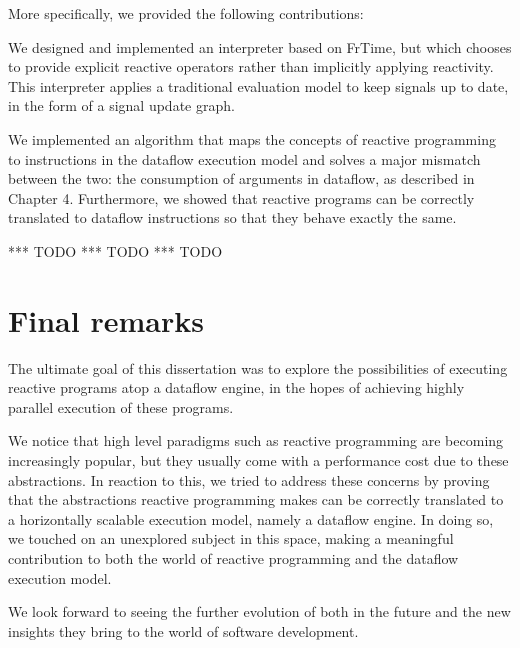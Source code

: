 More specifically, we provided the following contributions:

\begin{description}[style=nextline]
	\item[An interpreter for a reactive language] We designed and implemented an interpreter based on FrTime, but which chooses to provide explicit reactive operators rather than implicitly applying reactivity. This interpreter applies a traditional evaluation model to keep signals up to date, in the form of a signal update graph. 
	\item[A mapping algorithm from signals to dataflow instructions] We implemented an algorithm that maps the concepts of reactive programming to instructions in the dataflow execution model and solves a major mismatch between the two: the consumption of arguments in dataflow, as described in Chapter 4. Furthermore, we showed that reactive programs can be correctly translated to dataflow instructions so that they behave exactly the same. 
	\item[Comparison of a traditional reactive evaluation model and signals atop the dataflow execution model] *** TODO *** TODO *** TODO
\end{description}

\newpage
\section{Final remarks}

The ultimate goal of this dissertation was to explore the possibilities of executing reactive programs atop a dataflow engine, in the hopes of achieving highly parallel execution of these programs. 

We notice that high level paradigms such as reactive programming are becoming increasingly popular, but they usually come with a performance cost due to these abstractions. In reaction to this, we tried to address these concerns by proving that the abstractions reactive programming makes can be correctly translated to a horizontally scalable execution model, namely a dataflow engine. In doing so, we touched on an unexplored subject in this space, making a meaningful contribution to both the world of reactive programming and the dataflow execution model. 

We look forward to seeing the further evolution of both in the future and the new insights they bring to the world of software development.  
